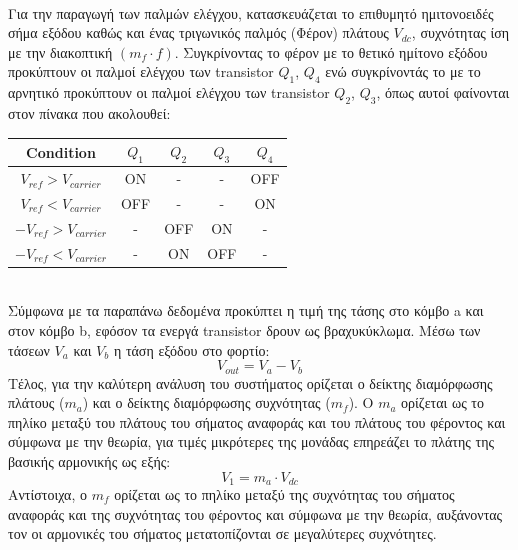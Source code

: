 \noindent\\
Για την παραγωγή των παλμών ελέγχου, κατασκευάζεται το επιθυμητό ημιτονοειδές σήμα εξόδου καθώς και ένας τριγωνικός παλμός (Φέρον) πλάτους $V_{dc}$, συχνότητας ίση με την διακοπτική $(m_f \cdot f)$. Συγκρίνοντας το φέρον με το θετικό ημίτονο εξόδου προκύπτουν οι παλμοί ελέγχου των transistor $Q_1$, $Q_4$ ενώ συγκρίνοντάς το με το αρνητικό προκύπτουν οι παλμοί ελέγχου των transistor $Q_2$, $Q_3$, όπως αυτοί φαίνονται στον πίνακα που ακολουθεί:
\begin{table}[h]
	\centering
	\begin{tabular}{ccccc}
		Condition                                     & $Q_1$ & $Q_2$ & $Q_3$ & $Q_4$ \\ \hline
		\multicolumn{1}{c|}{$V_{ref} > V_{carrier}$}  & ON    & -     & -     & OFF   \\
		\multicolumn{1}{c|}{$V_{ref} < V_{carrier}$}  & OFF   & -     & -     & ON    \\
		\multicolumn{1}{c|}{$-V_{ref} > V_{carrier}$} & -     & OFF   & ON    & -     \\
		\multicolumn{1}{c|}{$-V_{ref} < V_{carrier}$} & -     & ON    & OFF   & -    
	\end{tabular}
\end{table}
\noindent\\
Σύμφωνα με τα παραπάνω δεδομένα προκύπτει η τιμή της τάσης στο κόμβο a και στον κόμβο b, εφόσον τα ενεργά transistor δρουν ως βραχυκύκλωμα. Μέσω των τάσεων $V_a$ και $V_b$ η τάση εξόδου στο φορτίο:
\begin{equation}
	V_{out} = V_a - V_b
\end{equation}
\noindent
Τέλος, για την καλύτερη ανάλυση του συστήματος ορίζεται ο δείκτης διαμόρφωσης πλάτους ($m_a$) και ο δείκτης διαμόρφωσης συχνότητας ($m_f$). Ο  $m_a$ ορίζεται ως το πηλίκο μεταξύ του πλάτους του σήματος αναφοράς και του πλάτους του φέροντος και σύμφωνα με την θεωρία, για τιμές μικρότερες της μονάδας επηρεάζει το πλάτης της βασικής αρμονικής ως εξής:
\begin{equation}
	V_1 = m_a \cdot V_{dc}
\end{equation}
Αντίστοιχα, ο $m_f$ ορίζεται ως το πηλίκο μεταξύ της συχνότητας του σήματος αναφοράς και της συχνότητας του φέροντος και σύμφωνα με την θεωρία, αυξάνοντας τον οι αρμονικές του σήματος μετατοπίζονται σε μεγαλύτερες συχνότητες.


